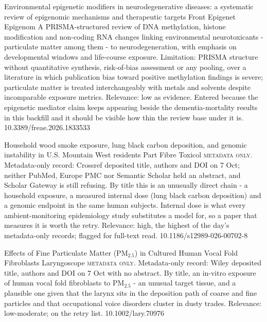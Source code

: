 \documentclass[10pt]{article}
\begin{document}
{Environmental epigenetic modifiers in neurodegenerative diseases: a systematic review of epigenomic mechanisms and therapeutic targets}
{Front Epigenet Epigenom}
{A PRISMA-structured review of DNA methylation, histone modification and non-coding RNA changes linking environmental neurotoxicants - particulate matter among them - to neurodegeneration, with emphasis on developmental windows and life-course exposure. Limitation: PRISMA structure without quantitative synthesis, risk-of-bias assessment or any pooling, over a literature in which publication bias toward positive methylation findings is severe; particulate matter is treated interchangeably with metals and solvents despite incomparable exposure metrics. Relevance: low as evidence. Entered because the epigenetic mediator claim keeps appearing beside the dementia-mortality results in this backfill and it should be visible how thin the review base under it is.}
{10.3389/freae.2026.1833533}

{Household wood smoke exposure, lung black carbon deposition, and genomic instability in U.S. Mountain West residents}
{Part Fibre Toxicol}
{\textsc{metadata only.} Metadata-only record: Crossref deposited title, authors and DOI on 7 Oct; neither PubMed, Europe PMC nor Semantic Scholar held an abstract, and Scholar Gateway is still refusing. By title this is an unusually direct chain - a household exposure, a measured internal dose (lung black carbon deposition) and a genomic endpoint in the same human subjects. Internal dose is what every ambient-monitoring epidemiology study substitutes a model for, so a paper that measures it is worth the retry. Relevance: high, the highest of the day's metadata-only records; flagged for full-text read.}
{10.1186/s12989-026-00702-8}

{Effects of Fine Particulate Matter (PM$_{2.5}$) in Cultured Human Vocal Fold Fibroblasts}
{Laryngoscope}
{\textsc{metadata only.} Metadata-only record: Wiley deposited title, authors and DOI on 7 Oct with no abstract. By title, an in-vitro exposure of human vocal fold fibroblasts to PM$_{2.5}$ - an unusual target tissue, and a plausible one given that the larynx sits in the deposition path of coarse and fine particles and that occupational voice disorders cluster in dusty trades. Relevance: low-moderate; on the retry list.}
{10.1002/lary.70976}

\par{}\baselineskip{}\baselineskip
{}
\end{document}
